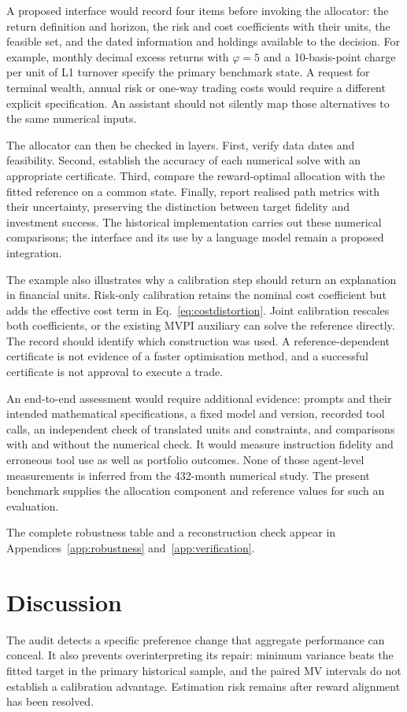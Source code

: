 \documentclass[sigconf,review]{acmart}
\begin{document}
A proposed interface would record four items before invoking the allocator: the return definition and horizon, the risk and cost coefficients with their units, the feasible set, and the dated information and holdings available to the decision. For example, monthly decimal excess returns with $\varphi=5$ and a 10-basis-point charge per unit of L1 turnover specify the primary benchmark state. A request for terminal wealth, annual risk or one-way trading costs would require a different explicit specification. An assistant should not silently map those alternatives to the same numerical inputs.

The allocator can then be checked in layers. First, verify data dates and feasibility. Second, establish the accuracy of each numerical solve with an appropriate certificate. Third, compare the reward-optimal allocation with the fitted reference on a common state. Finally, report realised path metrics with their uncertainty, preserving the distinction between target fidelity and investment success. The historical implementation carries out these numerical comparisons; the interface and its use by a language model remain a proposed integration.

The example also illustrates why a calibration step should return an explanation in financial units. Risk-only calibration retains the nominal cost coefficient but adds the effective cost term in Eq.\ \eqref{eq:costdistortion}. Joint calibration rescales both coefficients, or the existing MVPI auxiliary can solve the reference directly. The record should identify which construction was used. A reference-dependent certificate is not evidence of a faster optimisation method, and a successful certificate is not approval to execute a trade.

An end-to-end assessment would require additional evidence: prompts and their intended mathematical specifications, a fixed model and version, recorded tool calls, an independent check of translated units and constraints, and comparisons with and without the numerical check. It would measure instruction fidelity and erroneous tool use as well as portfolio outcomes. None of those agent-level measurements is inferred from the 432-month numerical study. The present benchmark supplies the allocation component and reference values for such an evaluation.

The complete robustness table and a reconstruction check appear in Appendices~\ref{app:robustness} and~\ref{app:verification}.

\balance
\section{Discussion}
The audit detects a specific preference change that aggregate performance can conceal. It also prevents overinterpreting its repair: minimum variance beats the fitted target in the primary historical sample, and the paired MV intervals do not establish a calibration advantage. Estimation risk remains after reward alignment has been resolved.
\end{document}
